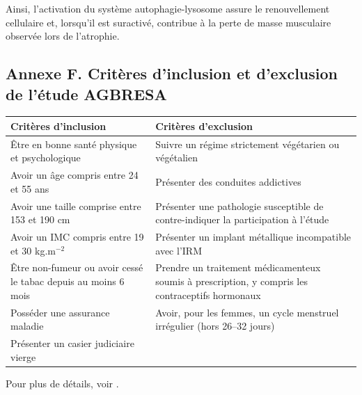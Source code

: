 \documentclass[11pt]{report}
\begin{document}
Ainsi, l'activation du système autophagie-lysosome assure le renouvellement cellulaire et, lorsqu'il est suractivé, contribue à la perte de masse musculaire observée lors de l'atrophie. 

\newpage

\subsection*{Annexe F. Critères d'inclusion et d'exclusion de l'étude AGBRESA} \label{annexeF}

\begin{table}[ht]
	\centering
	\renewcommand{\arraystretch}{1.7}
	\begin{tabularx}{\textwidth}{
			>{\raggedright\arraybackslash}X  %
			>{\raggedright\arraybackslash}X  %
		}
		\hline
		\textbf{Critères d'inclusion} & \textbf{Critères d'exclusion} \\
		\hline
		Être en bonne santé physique et psychologique 
		& Suivre un régime strictement végétarien ou végétalien \\
		
		Avoir un âge compris entre 24 et 55 ans 
		& Présenter des conduites addictives \\
		
		Avoir une taille comprise entre 153 et 190 cm 
		& Présenter une pathologie susceptible de contre-indiquer la participation à l'étude \\
		
		Avoir un IMC compris entre 19 et 30 kg.m$^{-2}$ 
		& Présenter un implant métallique incompatible avec l'IRM \\
		
		Être non-fumeur ou avoir cessé le tabac depuis au moins 6 mois 
		& Prendre un traitement médicamenteux soumis à prescription, y compris les contraceptifs hormonaux \\
		
		Posséder une assurance maladie 
		& Avoir, pour les femmes, un cycle menstruel irrégulier (hors 26–32 jours) \\
		
		Présenter un casier judiciaire vierge 
		&  \\
		\hline
	\end{tabularx}
\end{table}

Pour plus de détails, voir \textcite{Clement2022Sep}.

\newpage
\end{document}
